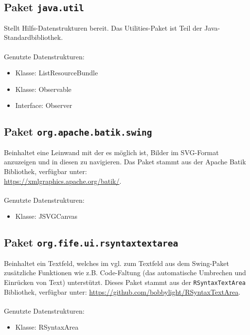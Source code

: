 \documentclass[parskip=full,11pt,twoside]{scrartcl}
\begin{document}
\subsection{Paket \texttt{java.util}}
Stellt Hilfs-Datenstrukturen bereit. Das Utilities-Paket ist Teil der Java-Standardbibliothek.\\\\Genutzte Datenstrukturen:

\begin{multicols}{2}
\begin{itemize}
	\item Klasse: ListResourceBundle
	\item Klasse: Observable
	\item Interface: Observer
\end{itemize}
\end{multicols}

\subsection{Paket \texttt{org.apache.batik.swing}}

Beinhaltet eine Leinwand mit der es möglich ist, Bilder im SVG-Format anzuzeigen und in diesen zu navigieren. Das Paket stammt aus der Apache Batik Bibliothek, verfügbar unter:\\ \url{https://xmlgraphics.apache.org/batik/}.\\\\Genutzte Datenstrukturen:
\begin{itemize}
	\item Klasse: JSVGCanvas
\end{itemize}

\subsection{Paket \texttt{org.fife.ui.rsyntaxtextarea}}

Beinhaltet ein Textfeld, welches im vgl. zum Textfeld aus dem Swing-Paket zusätzliche Funktionen wie z.B. Code-Faltung (das automatische Umbrechen und Einrücken von Text) unterstützt. Dieses Paket stammt aus der \texttt{RSyntaxTextArea} Bibliothek, verfügbar unter:  \url{https://github.com/bobbylight/RSyntaxTextArea}.\\\\Genutzte Datenstrukturen:
\begin{itemize}
	\item Klasse: RSyntaxArea
\end{itemize}
\end{document}
